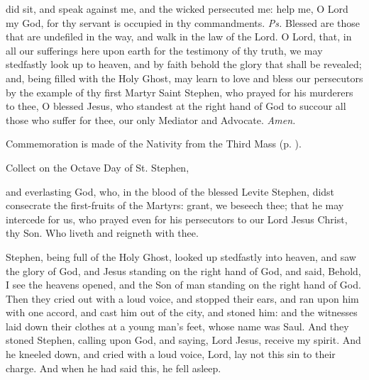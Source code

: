 \introit
{} did sit, and speak against me, and the wicked persecuted me: help me, O Lord my God, for thy servant is occupied in thy commandments. \textit{Ps.} Blessed are those that are undefiled in the way, and walk in the law of the Lord.
\collect
{} O Lord, that, in all our sufferings here upon earth for the testimony of thy truth, we may stedfastly look up to heaven, and by faith behold the glory that shall be revealed; and, being filled with the Holy Ghost, may learn to love and bless our persecutors by the example of thy first Martyr Saint Stephen, who prayed for his murderers to thee, O blessed Jesus, who standest at the right hand of God to succour all those who suffer for thee, our only Mediator and Advocate. \textit{Amen.}
\begin{rubric}
    Commemoration is made of the Nativity from the Third Mass (p. \pageref{NativityMassIII}).
\end{rubric}

\begin{rubric}
    Collect on the Octave Day of St. Stephen,
\end{rubric}
 and everlasting God, who, in the blood of the blessed Levite Stephen, didst consecrate the first-fruits of the Martyrs: grant, we beseech thee; that he may intercede for us, who prayed even for his persecutors to our Lord Jesus Christ, thy Son. Who liveth and reigneth with thee.

 Stephen, being full of the Holy Ghost, looked up stedfastly into heaven, and saw the glory of God, and Jesus standing on the right hand of God, and said, Behold, I see the heavens opened, and the Son of man standing on the right hand of God. Then they cried out with a loud voice, and stopped their ears, and ran upon him with one accord, and cast him out of the city, and stoned him: and the witnesses laid down their clothes at a young man’s feet, whose name was Saul. And they stoned Stephen, calling upon God, and saying, Lord Jesus, receive my spirit. And he kneeled down, and cried with a loud voice, Lord, lay not this sin to their charge. And when he had said this, he fell asleep.

